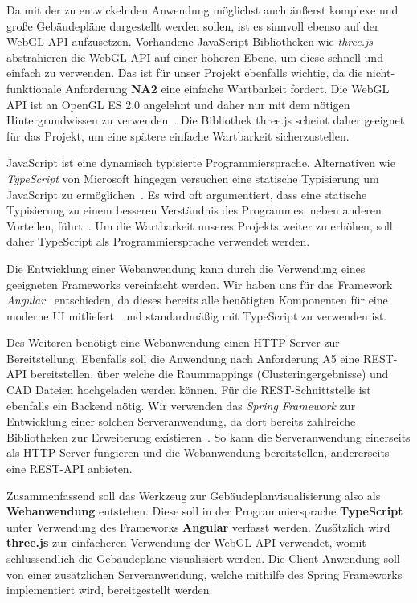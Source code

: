 Da mit der zu entwickelnden Anwendung möglichst auch äußerst komplexe und große Gebäudepläne dargestellt werden sollen, ist es sinnvoll ebenso auf der WebGL API aufzusetzen.
Vorhandene JavaScript Bibliotheken wie \textit{three.js}~\cite{ThreeJS} abstrahieren die WebGL API auf einer höheren Ebene, um diese schnell und einfach zu verwenden.
Das ist für unser Projekt ebenfalls wichtig, da die nicht-funktionale Anforderung \textbf{NA2} eine einfache Wartbarkeit fordert.
Die WebGL API ist an OpenGL ES 2.0 angelehnt und daher nur mit dem nötigen Hintergrundwissen zu verwenden~\cite{WebGL}.
Die Bibliothek three.js scheint daher geeignet für das Projekt, um eine spätere einfache Wartbarkeit sicherzustellen.

JavaScript ist eine dynamisch typisierte Programmiersprache.
Alternativen wie \textit{TypeScript} von Microsoft hingegen versuchen eine statische Typisierung um JavaScript zu ermöglichen~\cite{ToTypeOrNotToType}.
Es wird oft argumentiert, dass eine statische Typisierung zu einem besseren Verständnis des Programmes, neben anderen Vorteilen, führt~\cite{ToTypeOrNotToType}.
Um die Wartbarkeit unseres Projekts weiter zu erhöhen, soll daher TypeScript als Programmiersprache verwendet werden.

Die Entwicklung einer Webanwendung kann durch die Verwendung eines geeigneten Frameworks vereinfacht werden.
Wir haben uns für das Framework \textit{Angular}~\cite{Angular} entschieden, da dieses bereits alle benötigten Komponenten für eine moderne UI mitliefert~\cite{AngularMaterial} und standardmäßig mit TypeScript zu verwenden ist.

Des Weiteren benötigt eine Webanwendung einen HTTP-Server zur Bereitstellung.
Ebenfalls soll die Anwendung nach Anforderung A5 eine REST-API bereitstellen, über welche die Raummappings (Clusteringergebnisse) und CAD Dateien hochgeladen werden können.
Für die REST-Schnittstelle ist ebenfalls ein \glqq{}Backend\grqq{} nötig.
Wir verwenden das \textit{Spring Framework} zur Entwicklung einer solchen Serveranwendung, da dort bereits zahlreiche Bibliotheken zur Erweiterung existieren~\cite{SpringFramework}.
So kann die Serveranwendung einerseits als HTTP Server fungieren und die Webanwendung bereitstellen, andererseits eine REST-API anbieten.

Zusammenfassend soll das Werkzeug zur Gebäudeplanvisualisierung also als \textbf{Webanwendung} entstehen.
Diese soll in der Programmiersprache \textbf{TypeScript} unter Verwendung des Frameworks \textbf{Angular} verfasst werden.
Zusätzlich wird \textbf{three.js} zur einfacheren Verwendung der WebGL API verwendet, womit schlussendlich die Gebäudepläne visualisiert werden.
Die Client-Anwendung soll von einer zusätzlichen Serveranwendung, welche mithilfe des Spring Frameworks implementiert wird, bereitgestellt werden.

